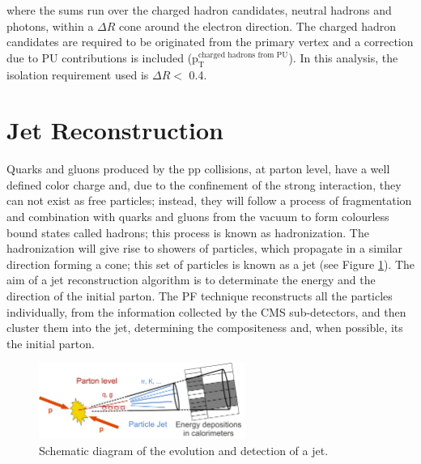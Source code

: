 \noindent where the sums run over the charged hadron candidates, neutral hadrons and photons, within
a $\Delta R$ cone around the electron direction. The charged hadron candidates are required to be
originated from the primary vertex \cite{ElectronID8TeV} and a correction due to PU contributions is included 
($\text{p}_\text{T}^{\text{charged hadrons from PU}}$). In this analysis, the isolation requirement used is
$\Delta R <$ 0.4.


\section{Jet Reconstruction}
\label{sec:Jet}

\noindent Quarks and gluons produced by the pp collisions, at parton level, have a 
well defined color charge and, due to the confinement of the strong 
interaction, they can not exist as free particles; instead, they 
will follow a process of fragmentation and combination with quarks and gluons from the vacuum to form 
colourless bound states called hadrons; this process is known as hadronization. The hadronization will 
give rise to showers of particles, which propagate in a similar direction forming a cone; this set 
of particles is known as a jet (see Figure \ref{fig:JetScketch}). The aim of a jet reconstruction 
algorithm is to determinate the energy and the direction of the initial parton. The PF technique 
reconstructs all the particles individually, from the information collected by the CMS sub-detectors,
and then cluster them into the jet, determining the compositeness and, 
when possible, its the initial parton. \\

\begin{figure}[ht]
  \begin{center}
    \includegraphics[width=0.6\textwidth]{figuras/Chapter3/JetSketch.png}
    \caption{Schematic diagram of the evolution and detection of a jet.}
    \label{fig:JetScketch}
  \end{center}
\end{figure}

